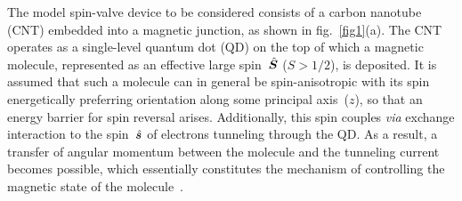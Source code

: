 \documentclass[doublecol]{epl2} %
\newcommand{\vopS}{\skew{3}{\hat}{\bm{S}}}
\newcommand{\vops}{\skew{3}{\hat}{\bm{s}}}
\newcommand{\via}{\emph{via}\xspace}
\begin{document}
%
The model spin-valve device to be considered consists of a carbon nanotube (CNT) embedded into a magnetic junction, as shown in fig.~\ref{fig1}(a). The CNT operates as a single-level quantum dot (QD) on the top of which a magnetic molecule, represented as an effective large spin~$\vopS$ (\mbox{$S>1/2$}), is deposited.
%
It is assumed that such a molecule can in general be spin-anisotropic with its spin energetically preferring orientation along some principal axis~($z$), so that an energy barrier for spin reversal arises. Additionally, this spin couples \via exchange interaction to the spin~$\vops$ of electrons tunneling through the QD. As a result, a transfer of angular momentum between the molecule and the tunneling current becomes possible, which essentially constitutes the mechanism of controlling the magnetic state of the molecule~\cite{Misiorny2009Jun}.
\end{document}
